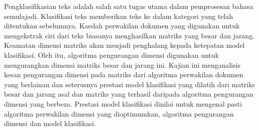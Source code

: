 Pengklasifikasian teks adalah salah satu tugas utama dalam pemprosesan bahasa semulajadi. Klasifikasi teks memberikan teks ke dalam kategori yang telah ditentukan sebelumnya. Kaedah perwakilan dokumen yang digunakan untuk mengekstrak ciri dari teks biasanya menghasilkan matriks yang besar dan jarang. Keamatan dimensi matriks akan menjadi penghalang kepada ketepatan model klasifikasi. Oleh itu, algoritma pengurangan dimensi digunakan untuk mengurangkan dimensi matriks besar dan jarang ini. Kajian ini menganalisis kesan pengurangan dimensi pada matriks dari algoritma perwakilan dokumen yang berlainan dan seterusnya prestasi model klasifikasi yang dilatih dari matriks besar dan jarang asal dan matriks yang terhasil daripada algoritma pengurangan dimensi yang berbeza. Prestasi model klasifikasi dinilai untuk mengenal pasti algoritma perwakilan dimensi yang dioptimumkan, algoritma pengurangan dimensi dan model klasifikasi.
